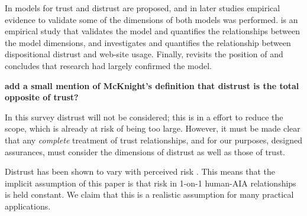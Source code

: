         In \citet{McKnight2001-gz} models for trust and distrust are proposed, and in later studies empirical evidence to validate some of the dimensions of both models was performed. \citet{McKnight2002-qx} is an empirical study that validates the model and quantifies the relationships between the model dimensions, and \citet{McKnight2004-vv} investigates and quantifies the relationship between dispositional distrust and web-site usage. Finally, \citet{McKnight2006-ce} revisits the position of \citet{McKnight1998-ty} and concludes that research had largely confirmed the model.

        \textbf{add a small mention of McKnight's definition that distrust is the total opposite of trust?}

        In this survey distrust will not be considered; this is in a effort to reduce the scope, which is already at risk of being too large. However, it must be made clear that any \emph{complete} treatment of trust relationships, and for our purposes, designed assurances, must consider the dimensions of distrust as well as those of trust. 
        
        Distrust has been shown to vary with perceived risk \cite{McKnight2004-vv}. This means that the implicit assumption of this paper is that risk in 1-on-1 human-AIA relationships is held constant. We claim that this is a realistic assumption for many practical applications.

\newpage


